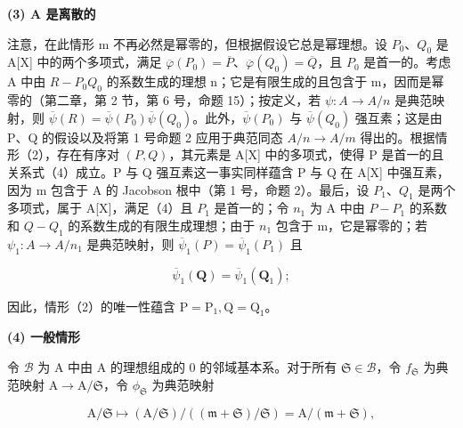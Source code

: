 \textbf{(3) A 是离散的}\par

注意，在此情形 m 不再必然是幂零的，但根据假设它总是幂理想。设 \(P_{0}\)、\(Q_{0}\) 是 A{[}X{]} 中的两个多项式，满足 \(\overline{\varphi}(P_{0}) = \overline{P}\)、\(\overline{\varphi}(Q_{0}) = \overline{Q}\)，且 \(P_{0}\) 是首一的。考虑 A 中由 \(R - P_{0}Q_{0}\) 的系数生成的理想 n；它是有限生成的且包含于 m，因而是幂零的（第二章，第 2 节，第 6 号，命题 15）；按定义，若 \(\psi: A \to A/n\) 是典范映射，则 \(\overline{\psi}(R) = \overline{\psi}(P_{0})\overline{\psi}(Q_{0})\)。此外，\(\overline{\psi}(P_{0})\) 与 \(\overline{\psi}(Q_{0})\) 强互素；这是由 P、Q 的假设以及将第 1 号命题 2 应用于典范同态 \(A/n \to A/m\) 得出的。根据情形（2），存在有序对 \((P, Q)\)，其元素是 A{[}X{]} 中的多项式，使得 P 是首一的且关系式（4）成立。P 与 Q 强互素这一事实同样蕴含 P 与 Q 在 A{[}X{]} 中强互素，因为 m 包含于 A 的 Jacobson 根中（第 1 号，命题 2）。最后，设 \(P_{1}\)、\(Q_{1}\) 是两个多项式，属于 A{[}X{]}，满足（4）且 \(P_{1}\) 是首一的；令 \(n_{1}\) 为 A 中由 \(P - P_{1}\) 的系数和 \(Q - Q_{1}\) 的系数生成的有限生成理想；由于 \(n_{1}\) 包含于 m，它是幂零的；若 \(\psi_{1}: A \to A/n_{1}\) 是典范映射，则 \(\overline{\psi}_{1}(P) = \overline{\psi}_{1}(P_{1})\) 且

\[
\overline {{{{\psi}}}} _ {1} (\mathbf {Q}) = \overline {{{{\psi}}}} _ {1} (\mathbf {Q} _ {1});
\]

因此，情形（2）的唯一性蕴含 \(\mathrm{P} = \mathrm{P}_1, \mathrm{Q} = \mathrm{Q}_1\)。

\textbf{(4) 一般情形}\par

令 \(\mathcal{B}\) 为 A 中由 A 的理想组成的 0 的邻域基本系。对于所有 \(\mathfrak{S} \in \mathcal{B}\)，令 \(f_{\mathfrak{S}}\) 为典范映射 \(\mathrm{A} \to \mathrm{A} / \mathfrak{S}\)，令 \(\phi_{\mathfrak{S}}\) 为典范映射

\[
\mathrm{A} / \mathfrak{S} \mapsto (\mathrm{A} / \mathfrak{S}) / ((\mathfrak {m} + \mathfrak{S}) / \mathfrak{S}) = \mathrm{A} / (\mathfrak {m} + \mathfrak{S}),
\]

